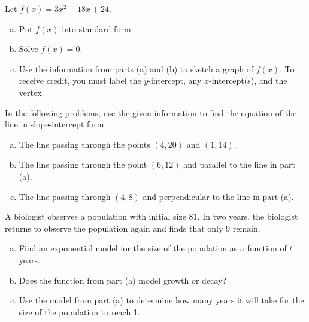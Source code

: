 \documentclass[12pt]{amsart}
\begin{document}
\newpage

\begin{thm}[9 Points]
  Let $f(x) = 3x^2 - 18x + 24.$
  \begin{enumerate}[(a)]
  \item
    Put $f(x)$ into standard form.
    \vspace{2in}
  \item
    Solve $f(x) = 0$.
    \vspace{2in}
  \item
    Use the information from parts (a) and (b) to sketch a graph of $f(x)$.
    To receive credit, you must label the $y$-intercept, any $x$-intercept(s), and the vertex.
    \vspace{2in}
  \end{enumerate}
\end{thm}

\newpage

\begin{thm}[9 Points]
  In the following problems, use the given information to find the equation of the line in slope-intercept form.
  \begin{enumerate}[(a)]
  \item
    The line passing through the points $(4,20)$ and $(1,14)$.
    \vspace{2in}
  \item
    The line passing through the point $(6, 12)$ and parallel to the line in part (a).
    \vspace{2in}
  \item
    The line passing through $(4, 8)$ and perpendicular to the line in part (a).
    \vspace{1in}
  \end{enumerate}
\end{thm}

\newpage

\begin{thm}[9 Points]
  A biologist observes a population with initial size $81$.
  In two years, the biologist returns to observe the population again and finds that only $9$ remain.
  \begin{enumerate}[(a)]
  \item
    Find an exponential model for the size of the population as a function of $t$ years.
    \vspace{1in}
  \item
    Does the function from part (a) model growth or decay?
    \vspace{1.5in}
  \item
    Use the model from part (a) to determine how many years it will take for the size of the population to reach 1.
    \vspace{1.5in}
  \end{enumerate}
\end{thm}
\end{document}
